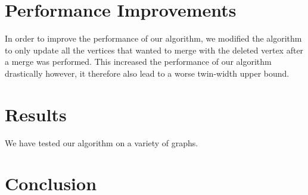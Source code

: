 \documentclass[10pt]{article}
\begin{document}
\section{Performance Improvements}
In order to improve the performance of our algorithm, we modified the algorithm to only
update all the vertices that wanted to merge with the deleted vertex after a merge was
performed. This increased the performance of our algorithm drastically however, it
therefore also lead to a worse twin-width upper bound.
\section{Results}
We have tested our algorithm on a variety of graphs.

\section{Conclusion}



\end{document}
